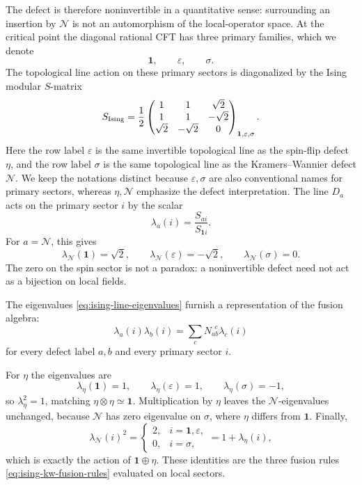 The defect is therefore noninvertible in a quantitative sense: surrounding
an insertion by \(\mathcal N\) is not an automorphism of the local-operator
space.  At the critical point the diagonal rational CFT has three primary
families, which we denote
\[
  \mathbf 1,\qquad \varepsilon,\qquad \sigma .
\]
The topological line action on these primary sectors is diagonalized by the
Ising modular \(S\)-matrix
\begin{equation}
  S_{\rm Ising}
  =
  \frac12
  \begin{pmatrix}
    1&1&\sqrt2\\
    1&1&-\sqrt2\\
    \sqrt2&-\sqrt2&0
  \end{pmatrix}_{\mathbf 1,\varepsilon,\sigma}.
  \label{eq:ising-modular-s-matrix}
\end{equation}
Here the row label \(\varepsilon\) is the same invertible topological line
as the spin-flip defect \(\eta\), and the row label \(\sigma\) is the same
topological line as the Kramers--Wannier defect \(\mathcal N\).  We keep the
notations distinct because \(\varepsilon,\sigma\) are also conventional
names for primary sectors, whereas \(\eta,\mathcal N\) emphasize the defect
interpretation.
The line \(D_a\) acts on the primary sector \(i\) by the scalar
\begin{equation}
  \lambda_a(i)=\frac{S_{ai}}{S_{\mathbf 1 i}} .
  \label{eq:ising-line-eigenvalues}
\end{equation}
For \(a=\mathcal N\), this gives
\[
  \lambda_{\mathcal N}(\mathbf 1)=\sqrt2,\qquad
  \lambda_{\mathcal N}(\varepsilon)=-\sqrt2,\qquad
  \lambda_{\mathcal N}(\sigma)=0 .
\]
The zero on the spin sector is not a paradox: a noninvertible defect need not
act as a bijection on local fields.

\begin{remark}
\label{rem:ising-defect-action-fusion}
The eigenvalues \eqref{eq:ising-line-eigenvalues} furnish a representation
of the fusion algebra:
\[
  \lambda_a(i)\lambda_b(i)
  =
  \sum_c N_{ab}^{\ \ c}\lambda_c(i)
\]
for every defect label \(a,b\) and every primary sector \(i\).

For \(\eta\) the eigenvalues are
\[
  \lambda_\eta(\mathbf 1)=1,\qquad
  \lambda_\eta(\varepsilon)=1,\qquad
  \lambda_\eta(\sigma)=-1,
\]
so \(\lambda_\eta^2=1\), matching
\(\eta\otimes\eta\simeq\mathbf 1\).  Multiplication by \(\eta\) leaves the
\(\mathcal N\)-eigenvalues unchanged, because
\(\mathcal N\) has zero eigenvalue on \(\sigma\), where \(\eta\) differs from
\(\mathbf 1\).  Finally,
\[
  \lambda_{\mathcal N}(i)^2
  =
  \begin{cases}
  2,& i=\mathbf 1,\varepsilon,\\
  0,& i=\sigma,
  \end{cases}
  =
  1+\lambda_\eta(i),
\]
which is exactly the action of
\(\mathbf 1\oplus\eta\).  These identities are the three fusion rules
\eqref{eq:ising-kw-fusion-rules} evaluated on local sectors.
\end{remark}

